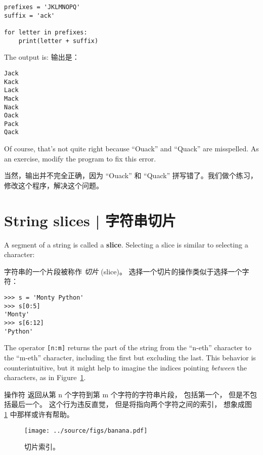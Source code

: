 \begin{lstlisting}
prefixes = 'JKLMNOPQ'
suffix = 'ack'

for letter in prefixes:
    print(letter + suffix)
\end{lstlisting}

%
The output is:
输出是：

\begin{lstlisting}
Jack
Kack
Lack
Mack
Nack
Oack
Pack
Qack
\end{lstlisting}

%
Of course, that's not quite right because ``Ouack'' and ``Quack'' are
misspelled.  As an exercise, modify the program to fix this error.

当然，输出并不完全正确，因为 ``Ouack'' 和 ``Quack'' 拼写错了。我们做个练习， 修改这个程序，解决这个问题。



\section{String slices  |  字符串切片}
\label{slice}
  
 

A segment of a string is called a {\bf slice}.  Selecting a slice is
similar to selecting a character:

字符串的一个片段被称作 {\em 切片} (slice)。 选择一个切片的操作类似于选择一个字符：

\begin{lstlisting}
>>> s = 'Monty Python'
>>> s[0:5]
'Monty'
>>> s[6:12]
'Python'
\end{lstlisting}

%
The operator {\tt [n:m]} returns the part of the string from the
``n-eth'' character to the ``m-eth'' character, including the first but
excluding the last.  This behavior is counterintuitive, but it might
help to imagine the indices pointing {\em between} the
characters, as in Figure~\ref{fig.banana}.

操作符 \li{[n:m]} 返回从第 n 个字符到第 m 个字符的字符串片段， 包括第一个， 但是不包括最后一个。 这个行为违反直觉， 但是将指向两个字符之间的索引， 想象成图~ \ref{fig.banana} 中那样或许有帮助。

\begin{figure}
\centerline
{\texttt{[image: ../source/figs/banana.pdf]}}
\caption{切片索引。}
\label{fig.banana}
\end{figure}

